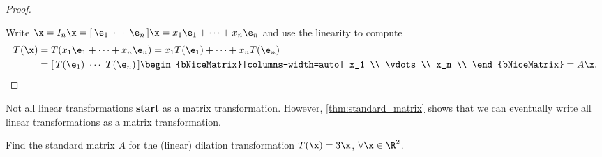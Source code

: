 \begin{proof}
  \label{prf:standard_matrix}

  Write $\x = I_n\x = [\,\e_1~\cdots~\e_n\,]\x = x_1\e_1 + \cdots + x_n\e_n$ and
  use the linearity to compute
  \begin{align*}
    T(\x) &= T(x_1\e_1 + \cdots + x_n\e_n) = x_1T(\e_1) + \cdots + x_nT(\e_n) \\
          &= [\,T(\e_1)~\cdots~T(\e_n)\,]
          \begin{bNiceMatrix}[columns-width=auto]
            x_1 \\
            \vdots \\
            x_n \\
          \end{bNiceMatrix} = A\x
  .\qedhere\end{align*}
\end{proof}

\begin{note}
  \label{nte:standard_matrix}

  Not all linear transformations \textbf{start} as a matrix transformation.
  However, \cref{thm:standard_matrix} shows that we can eventually write all
  linear transformations as a matrix transformation.
\end{note}

\begin{question}
  \label{qst:standard_matrix_1}

  Find the standard matrix $A$ for the (linear) dilation transformation $T(\x) =
  3\x$, $\forall \x \in \R^2$.
\end{question}

